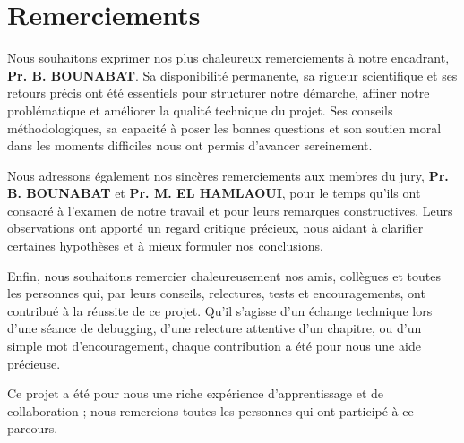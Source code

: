 \chapter*{Remerciements}
\noindent Nous souhaitons exprimer nos plus chaleureux remerciements à notre encadrant, \textbf{Pr. B. BOUNABAT}. Sa disponibilité permanente, sa rigueur scientifique et ses retours précis ont été essentiels pour structurer notre démarche, affiner notre problématique et améliorer la qualité technique du projet. Ses conseils méthodologiques, sa capacité à poser les bonnes questions et son soutien moral dans les moments difficiles nous ont permis d'avancer sereinement.

\vspace{0.5cm}
\noindent Nous adressons également nos sincères remerciements aux membres du jury, \textbf{Pr. B. BOUNABAT} et \textbf{Pr. M. EL HAMLAOUI}, pour le temps qu'ils ont consacré à l'examen de notre travail et pour leurs remarques constructives. Leurs observations ont apporté un regard critique précieux, nous aidant à clarifier certaines hypothèses et à mieux formuler nos conclusions.

\vspace{0.5cm}
\noindent Enfin, nous souhaitons remercier chaleureusement nos amis, collègues et toutes les personnes qui, par leurs conseils, relectures, tests et encouragements, ont contribué à la réussite de ce projet. Qu'il s'agisse d'un échange technique lors d'une séance de debugging, d'une relecture attentive d'un chapitre, ou d'un simple mot d'encouragement, chaque contribution a été pour nous une aide précieuse.

\vspace{0.5cm}
\noindent Ce projet a été pour nous une riche expérience d'apprentissage et de collaboration ; nous remercions toutes les personnes qui ont participé à ce parcours.
